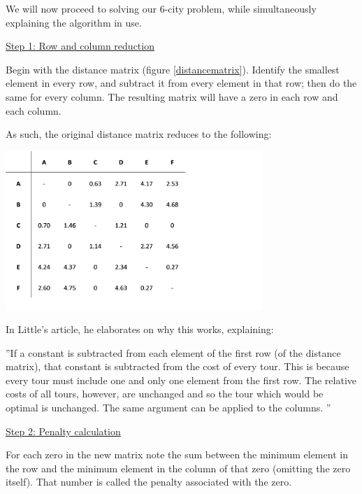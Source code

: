 \vspace{5mm}

We will now proceed to solving our 6-city problem, while simultaneously explaining the algorithm in use.

\vspace{5mm}

\underline{Step 1: Row and column reduction}
\vspace{1mm}

Begin with the distance matrix (figure \ref{distancematrix}). Identify the smallest element in every row, and subtract it from every element in that row; then do the same for every column. The resulting matrix will have a zero in each row and each column.

\vspace{5mm}

As such, the original distance matrix reduces to the following:
\vspace{3mm}

\includegraphics[height=6cm]{dmreduced}
	
	
In Little’s article, he elaborates on why this works, explaining:
\vspace{-1mm}

\begin{displayquote} 
''If a constant is subtracted from each element of the first row (of the distance matrix), that constant is subtracted from the cost of every tour. This is because every tour must include one and only one element from the first row. The relative costs of all tours, however, are unchanged and so the tour which would be optimal is unchanged. The same argument can be applied to the columns.	''
\end{displayquote}
	
	
\underline{Step 2: Penalty calculation}	
\vspace{1mm}
	
For each zero in the new matrix note the sum between the minimum element in the row and the minimum element in the column of that zero (omitting the zero itself). That number is called the penalty associated with the zero.

